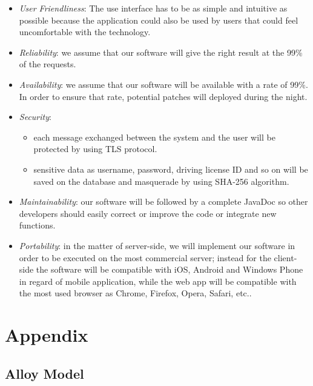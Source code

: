 \documentclass[english]{article}
\begin{document}
\begin{itemize}

  \item{\textit{User Friendliness}:
    The use interface has to be as simple and intuitive as possible because
    the application could also be used by users that could feel uncomfortable with the technology.}

  \item{\textit{Reliability}: we assume that our software will give the right result at the 99\% of the requests.}

  \item{\textit{Availability}: we assume that our software will be available with a rate of 99\%.
                               In order to ensure that rate, potential patches will deployed during the night.}

  \item{\textit{Security}:
    \begin{itemize}
      \item{each message exchanged between the system and the user will be protected by using TLS protocol.}
      \item{sensitive data as username, password, driving license ID and so on will be saved on the database and masquerade by using SHA-256 algorithm.}
\end{itemize}}
  \item{\textit{Maintainability}: our software will be followed by a complete JavaDoc so other developers should easily correct or improve the code
                                  or integrate new functions.}

  \item{\textit{Portability}: in the matter of server-side, we will implement our software in order to be executed on the most commercial server;
                              instead for the client-side the software will be compatible with iOS, Android and Windows Phone in regard of mobile application,
                              while the web app will be compatible with the most used browser as Chrome, Firefox, Opera, Safari, etc..}

\end{itemize}

\newpage{}

\section{Appendix}

\subsection{Alloy Model}
\end{document}
